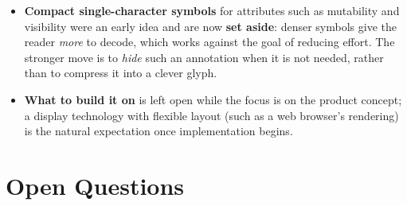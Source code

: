 \documentclass[11pt]{article}
\begin{document}
\begin{deferbox}
\begin{itemize}[leftmargin=1.4em,itemsep=4pt]
  \item \textbf{Compact single-character symbols} for attributes such as mutability and visibility were an early idea and are now \textbf{set aside}: denser symbols give the reader \emph{more} to decode, which works against the goal of reducing effort. The stronger move is to \emph{hide} such an annotation when it is not needed, rather than to compress it into a clever glyph.
  \item \textbf{What to build it on} is left open while the focus is on the product concept; a display technology with flexible layout (such as a web browser's rendering) is the natural expectation once implementation begins.
\end{itemize}
\end{deferbox}

\section{Open Questions}
\label{sec:open}
\end{document}
